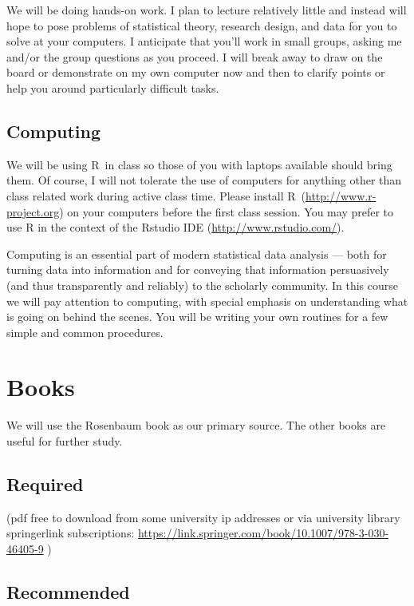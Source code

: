 \documentclass[10pt,letterpaper]{article}
\newenvironment{introstuff} {\setcounter{secnumdepth}{0}%
} {\setcounter{secnumdepth}{1}%
\restoregeometry
}
\begin{document}
\begin{introstuff}
  We will be doing hands-on work. I plan to lecture relatively little and
  instead will hope to pose problems of statistical theory, research
  design, and data for you to solve at your computers. I anticipate that
  you'll work in small groups, asking me and/or the group questions as
  you proceed. I will break away to draw on the board or demonstrate on
  my own computer now and then to clarify points or help you around
  particularly difficult tasks.

  \subsection{Computing}

  We will be using R~in class so those of you with laptops available
  should bring them. Of course, I will not tolerate the use of computers
  for anything other than class related work during active class
  time. Please install R~(\url{http://www.r-project.org}) on your
  computers before the first class session. You may prefer to use R in the
  context of the Rstudio IDE (\url{http://www.rstudio.com/}).

  Computing is an essential part of modern statistical data analysis ---
  both for turning data into information and for conveying that information
  persuasively (and thus transparently and reliably) to the scholarly
  community. In this course we will pay attention to computing, with special
  emphasis on understanding what is going on behind the scenes. You will
  be writing your own routines for a few simple and common procedures.

  \section{Books}\vspace{-1.5em}

  We will use the Rosenbaum book as our primary source. The other books are useful for further study.


  \subsection{Required}
   (pdf free to download from some
  university  ip addresses or via university library springerlink
  subscriptions: \url{https://link.springer.com/book/10.1007/978-3-030-46405-9}
  )

  \subsection{Recommended}


\end{introstuff}
\end{document}
